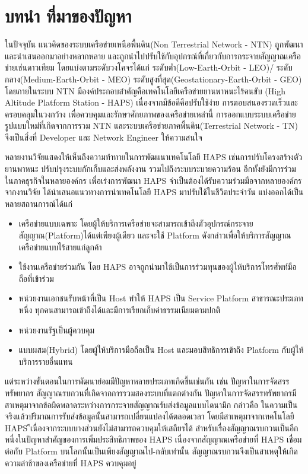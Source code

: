 \section{บทนำ ที่มาของปัญหา}

ในปัจจุบัน แนวคิดของระบบเครือข่ายเหนือพื้นดิน(Non Terrestrial Network - NTN) ถูกพัฒนาและนำเสนออกมาอย่างหลากหลาย
และถูกนำไปปรับใช้กับอุปกรณ์ที่เกี่ยวกับการกระจายสัญญาณเครือข่ายเช่นดาวเทียม โดยแบ่งตามระดับวงโคจรได้แก่ ระดับต่ำ(Low-Earth-Orbit - LEO)/
ระดับกลาง(Medium-Earth-Orbit - MEO) ระดับสูงที่สุด(Geostationary-Earth-Orbit - GEO)
โดยภายในระบบ NTN มีองค์ประกอบสำคัญคือเทคโนโลยีเครือข่ายยานพาหนะไร้คนขับ (High Altitude Platform Station - HAPS)
เนื่องจากมีข้อดีคือปรับใช้ง่าย การตอบสนองรวดเร็วและครอบคลุมในวงกว้าง เพื่อควบคุมและรักษาศักยภาพของเครือข่ายเหล่านี้ 
การออกแบบระบบเครือข่ายรูปแบบใหม่ที่เกิดจากการรวม NTN และระบบเครือข่ายภาคพื้นดิน(Terrestrial Network - TN) 
จึงเป็นสิ่งที่ Developer และ Network Engineer ให้ความสนใจ

หลายงานวิจัยแสดงให้เห็นถึงความท้าทายในการพัฒแนาเทคโนโลยี HAPS เช่นการปรับโครงสร้างตัวยานพาหนะ ปรับปรุงระบบกักเก็บและส่งพลังงาน
รวมไปถึงระบบระบายความร้อน อีกทั้งยังมีการร่วมในภาคธุรกิจในหลายองค์กร เพื่อเร่งการพัฒนา HAPS จำเป็นต้องได้รับความร่วมมือจากหลายองค์กร
จากงานวิจัย \cite[Towers]{High Altitude Platform Systems: Towers in the Skies} 
ได้นำเสนอแนวทางการนำเทคโนโลยี HAPS มาปรับใช้ในชีวิตประจำวัน แบ่งออกได้เป็นหลายสถานการณ์ได้แก่
\begin{itemize}
    \item เครือข่ายแบบเฉพาะ โดยผู้ให้บริการเครือข่ายจะสามารถเข้าถึงตัวอุปกรณ์กระจายสัญญาณ(Platform)ได้แต่เพียงผู้เดียว 
    และจะใช้ Platform ดังกล่าวเพื่อให้บริการสัญญาณเครือข่ายแบบไร้สายแก่ลูกค้า
    \item ใช้งานเครือข่ายร่วมกัน โดย HAPS อาจถูกนำมาใช้เป็นการร่วมทุนของผู้ให้บริการโทรศัพท์มือถือที่เข้าร่วม
    \item หน่วยงานเอกชนรับหน้าที่เป็น Host ทำให้ HAPS เป็น Service Platform สาธารณะประเภทหนึ่ง
    ทุกคนสามารถเข้าถึงได้และมีการเรียกเก็บค่าธรรมเนียมตามปกติ
    \item หน่วยงานรัฐเป็นผู้ควบคุม
    \item แบบผสม(Hybrid) โดยผู้ให้บริการมือถือเป็น Host และมอบสิทธิการเข้าถึง Platform กับผู้ให้บริการรายอื่นแทน
\end{itemize}
แต่ระหว่างขั้นตอนในการพัฒนาย่อมมีปัญหาหลายประเภทเกิดขึ้นเช่นกัน เช่น ปัญหาในการจัดสรรทรัพยากร 
สัญญาณรบกวนที่เกิดจากการรวมสองระบบที่แตกต่างกัน ปัญหาในการจัดสรรทรัพยากรมีสาเหตุมาจากข้อผิดพลาดระหว่างการกระจายสัญญาณรับส่งข้อมูลแบบไดนามิก 
กล่าวคือ ในความเป็นจริงแล้วปริมาณการรับส่งข้อมูลนั้นสามารถเปลี่ยนแปลงได้ตลอดเวลา โดยมีสาเหตุมาจากเทคโนโลยี HAPS
ีเนื่องจากระบบบางส่วนยังไม่สามารถควบคุมให้เสถียรได้ สำหรับเรื่องสัญญาณรบกวนเป็นอีกหนึ่งในปัญหาสำคัญของการเพิ่มประสิทธิภาพของ HAPS เนื่องจากสัญญาณเครือข่ายที่ HAPS เชื่อมต่อกับ Platform
บนโลกนั้นเป็นเพียงสัญญาณไป-กลับเท่านั้น สัญญาณรบกวนจึงเป็นสาเหตุให้เกิดความล่าช้าของเครือข่ายที่ HAPS ควบคุมอยู่

